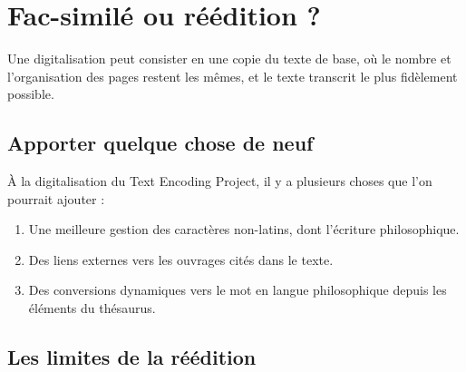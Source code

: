\section{Fac-similé ou réédition ?}\label{WilkinsReed}
Une digitalisation peut consister en une copie du texte de base, où le nombre et l'organisation des pages restent les mêmes, et  le texte transcrit le plus fidèlement possible.
\subsection{Apporter quelque chose de neuf}
À la digitalisation du Text Encoding Project, il y a plusieurs choses que l'on pourrait ajouter :
\begin{enumerate}
\item Une meilleure gestion des caractères non-latins, dont l'écriture philosophique.
\item Des liens externes vers les ouvrages cités dans le texte.
\item Des conversions dynamiques vers le mot en langue philosophique depuis les éléments du thésaurus.
\end{enumerate}
\subsection{Les limites de la réédition}
